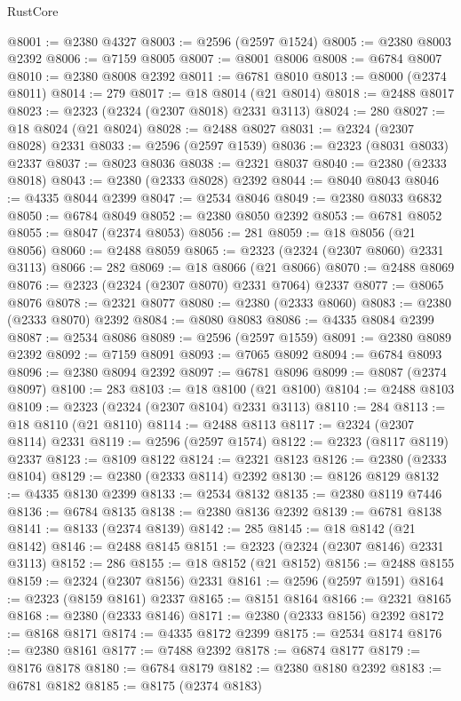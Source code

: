 \begin{lexlean}{RustCore}
\begin{coremodule}
@8001 := @2380 @4327
@8003 := @2596 (@2597 @1524)
@8005 := @2380 @8003 @2392
@8006 := @7159 @8005
@8007 := @8001 @8006
@8008 := @6784 @8007
@8010 := @2380 @8008 @2392
@8011 := @6781 @8010
@8013 := @8000 (@2374 @8011)
@8014 := 279
@8017 := @18 @8014 (@21 @8014)
@8018 := @2488 @8017
@8023 := @2323 (@2324 (@2307 @8018) @2331 @3113)
@8024 := 280
@8027 := @18 @8024 (@21 @8024)
@8028 := @2488 @8027
@8031 := @2324 (@2307 @8028) @2331
@8033 := @2596 (@2597 @1539)
@8036 := @2323 (@8031 @8033) @2337
@8037 := @8023 @8036
@8038 := @2321 @8037
@8040 := @2380 (@2333 @8018)
@8043 := @2380 (@2333 @8028) @2392
@8044 := @8040 @8043
@8046 := @4335 @8044 @2399
@8047 := @2534 @8046
@8049 := @2380 @8033 @6832
@8050 := @6784 @8049
@8052 := @2380 @8050 @2392
@8053 := @6781 @8052
@8055 := @8047 (@2374 @8053)
@8056 := 281
@8059 := @18 @8056 (@21 @8056)
@8060 := @2488 @8059
@8065 := @2323 (@2324 (@2307 @8060) @2331 @3113)
@8066 := 282
@8069 := @18 @8066 (@21 @8066)
@8070 := @2488 @8069
@8076 := @2323 (@2324 (@2307 @8070) @2331 @7064) @2337
@8077 := @8065 @8076
@8078 := @2321 @8077
@8080 := @2380 (@2333 @8060)
@8083 := @2380 (@2333 @8070) @2392
@8084 := @8080 @8083
@8086 := @4335 @8084 @2399
@8087 := @2534 @8086
@8089 := @2596 (@2597 @1559)
@8091 := @2380 @8089 @2392
@8092 := @7159 @8091
@8093 := @7065 @8092
@8094 := @6784 @8093
@8096 := @2380 @8094 @2392
@8097 := @6781 @8096
@8099 := @8087 (@2374 @8097)
@8100 := 283
@8103 := @18 @8100 (@21 @8100)
@8104 := @2488 @8103
@8109 := @2323 (@2324 (@2307 @8104) @2331 @3113)
@8110 := 284
@8113 := @18 @8110 (@21 @8110)
@8114 := @2488 @8113
@8117 := @2324 (@2307 @8114) @2331
@8119 := @2596 (@2597 @1574)
@8122 := @2323 (@8117 @8119) @2337
@8123 := @8109 @8122
@8124 := @2321 @8123
@8126 := @2380 (@2333 @8104)
@8129 := @2380 (@2333 @8114) @2392
@8130 := @8126 @8129
@8132 := @4335 @8130 @2399
@8133 := @2534 @8132
@8135 := @2380 @8119 @7446
@8136 := @6784 @8135
@8138 := @2380 @8136 @2392
@8139 := @6781 @8138
@8141 := @8133 (@2374 @8139)
@8142 := 285
@8145 := @18 @8142 (@21 @8142)
@8146 := @2488 @8145
@8151 := @2323 (@2324 (@2307 @8146) @2331 @3113)
@8152 := 286
@8155 := @18 @8152 (@21 @8152)
@8156 := @2488 @8155
@8159 := @2324 (@2307 @8156) @2331
@8161 := @2596 (@2597 @1591)
@8164 := @2323 (@8159 @8161) @2337
@8165 := @8151 @8164
@8166 := @2321 @8165
@8168 := @2380 (@2333 @8146)
@8171 := @2380 (@2333 @8156) @2392
@8172 := @8168 @8171
@8174 := @4335 @8172 @2399
@8175 := @2534 @8174
@8176 := @2380 @8161
@8177 := @7488 @2392
@8178 := @6874 @8177
@8179 := @8176 @8178
@8180 := @6784 @8179
@8182 := @2380 @8180 @2392
@8183 := @6781 @8182
@8185 := @8175 (@2374 @8183)

\end{coremodule}
\end{lexlean}

